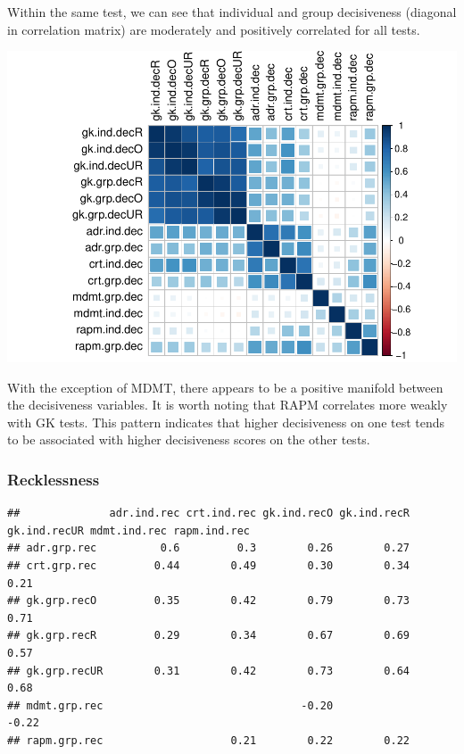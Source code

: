 \documentclass[]{article}
\begin{document}
Within the same test, we can see that individual and group decisiveness
(diagonal in correlation matrix) are moderately and positively
correlated for all tests.

\includegraphics{corr_analyses_files/figure-latex/decisiveness2-1.pdf}

With the exception of MDMT, there appears to be a positive manifold
between the decisiveness variables. It is worth noting that RAPM
correlates more weakly with GK tests. This pattern indicates that higher
decisiveness on one test tends to be associated with higher decisiveness
scores on the other tests.

\subsubsection{Recklessness}\label{recklessness}

\begin{verbatim}
##              adr.ind.rec crt.ind.rec gk.ind.recO gk.ind.recR gk.ind.recUR mdmt.ind.rec rapm.ind.rec
## adr.grp.rec          0.6         0.3        0.26        0.27                                       
## crt.grp.rec         0.44        0.49        0.30        0.34         0.21                          
## gk.grp.recO         0.35        0.42        0.79        0.73         0.71                          
## gk.grp.recR         0.29        0.34        0.67        0.69         0.57                          
## gk.grp.recUR        0.31        0.42        0.73        0.64         0.68                          
## mdmt.grp.rec                               -0.20                    -0.22                          
## rapm.grp.rec                    0.21        0.22        0.22
\end{verbatim}
\end{document}

